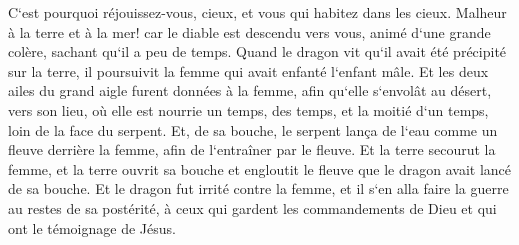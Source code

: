 \verse C`est pourquoi réjouissez-vous, cieux, et vous qui habitez dans les cieux. Malheur à la terre et à la mer! car le diable est descendu vers vous, animé d`une grande colère, sachant qu`il a peu de temps. 
\verse Quand le dragon vit qu`il avait été précipité sur la terre, il poursuivit la femme qui avait enfanté l`enfant mâle. 
\verse Et les deux ailes du grand aigle furent données à la femme, afin qu`elle s`envolât au désert, vers son lieu, où elle est nourrie un temps, des temps, et la moitié d`un temps, loin de la face du serpent. 
\verse Et, de sa bouche, le serpent lança de l`eau comme un fleuve derrière la femme, afin de l`entraîner par le fleuve. 
\verse Et la terre secourut la femme, et la terre ouvrit sa bouche et engloutit le fleuve que le dragon avait lancé de sa bouche. 
\verse Et le dragon fut irrité contre la femme, et il s`en alla faire la guerre au restes de sa postérité, à ceux qui gardent les commandements de Dieu et qui ont le témoignage de Jésus. 

